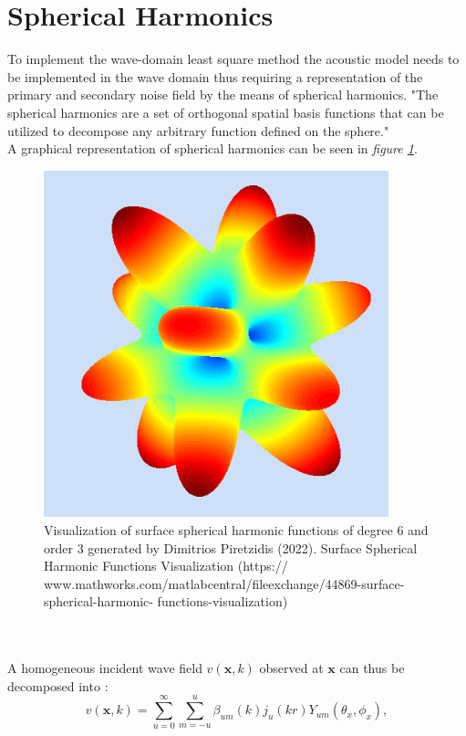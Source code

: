 \section{Spherical Harmonics}
To implement the wave-domain least square method the acoustic model needs to be implemented in the wave domain thus requiring a representation of the primary and secondary noise field by the means of spherical harmonics.
"The spherical harmonics are a set of orthogonal spatial basis functions that can be utilized
to decompose any arbitrary function defined on the sphere."\cite{Samarasinghe2018}\\ 
A graphical representation of spherical harmonics can be seen in \textit{figure \ref{fig:sph_harmonics}}.\\
\begin{figure}[H]
    \centerline{\includegraphics[width=100mm,keepaspectratio]{LaTeX/images/plots/spherical_hamonics.png}}
    \caption{Visualization of surface spherical harmonic functions of degree 6 and order 3 generated by Dimitrios Piretzidis (2022). Surface Spherical Harmonic Functions Visualization (https:// www.mathworks.com/matlabcentral/fileexchange/44869-surface-spherical-harmonic- functions-visualization)}
    \label{fig:sph_harmonics}
\end{figure}
\\\\
A homogeneous incident wave field $v(\mathbf{x},k)$ observed at $\mathbf{x}$ can thus be decomposed into \cite{Zhang2019}:
\begin{equation}
    v(\mathbf{x},k)=\sum_{u=0}^\infty \sum_{m=-u}^u\beta_{um}(k)j_u(kr)Y_{um}(\theta_x,\phi_x),
    \label{eq:wave_field_decomposition}
\end{equation}
